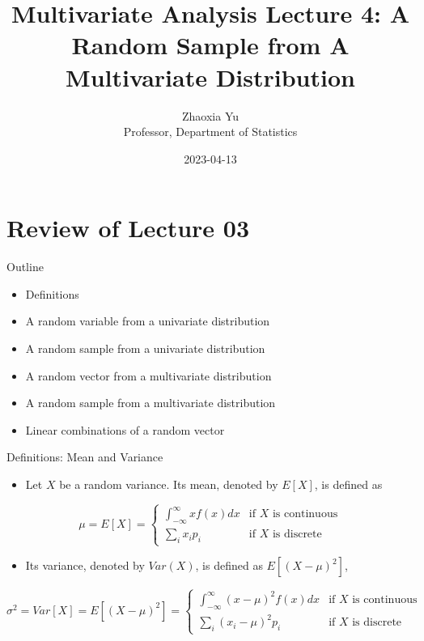 \documentclass[
  ignorenonframetext,
]{beamer}
\title{Multivariate Analysis Lecture 4: A Random Sample from A
Multivariate Distribution}
\author{Zhaoxia Yu\\
Professor, Department of Statistics}
\date{2023-04-13}
\providecommand{\tightlist}{%
  \setlength{\itemsep}{0pt}\setlength{\parskip}{0pt}}
\begin{document}
\frame{\titlepage}

\hypertarget{review-of-lecture-03}{%
\section{Review of Lecture 03}\label{review-of-lecture-03}}

\begin{frame}{Outline}
\protect\hypertarget{outline}{}
\begin{itemize}
\tightlist
\item
  Definitions
\item
  A random variable from a univariate distribution
\item
  A random sample from a univariate distribution
\item
  A random vector from a multivariate distribution
\item
  A random sample from a multivariate distribution
\item
  Linear combinations of a random vector
\end{itemize}
\end{frame}

\begin{frame}{Definitions: Mean and Variance}
\protect\hypertarget{definitions-mean-and-variance}{}
\begin{itemize}
\tightlist
\item
  Let \(X\) be a random variance. Its mean, denoted by \(E[X]\), is
  defined as
\end{itemize}

\[
\mu=E[X] = \left\{
    \begin{array}{ll}
    \int_{-\infty}^{\infty} x f(x) dx & \mbox{if } X \mbox{ is continuous}\\
    \sum_{i} x_i p_i & \mbox{if } X \mbox{ is discrete}    \end{array}
\right.
\]

\begin{itemize}
\tightlist
\item
  Its variance, denoted by \(Var(X)\), is defined as \(E[(X-\mu)^2]\),
\end{itemize}

\[
\sigma^2=Var[X] = E[(X-\mu)^2] = \left\{
    \begin{array}{ll}
    \int_{-\infty}^{\infty} (x-\mu)^2 f(x) dx & \mbox{if } X \mbox{ is continuous}\\
    \sum_{i} (x_i-\mu)^2 p_i & \mbox{if } X \mbox{ is discrete}    \end{array}
\right.
\]
\end{frame}
\end{document}
